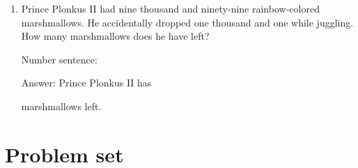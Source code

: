 \documentclass{tufte-book}
\begin{document}
\begin{enumerate}
  \item Prince Plonkus II had nine thousand and ninety-nine rainbow-colored marshmallows.
  He accidentally dropped one thousand and one while juggling.
  How many marshmallows does he have left?\bigskip\par
Number sentence: \dotfill\bigskip\par
Answer: Prince Plonkus II has 
\dotfill\bigskip\par\mbox{}\dotfill\bigskip\par\mbox{}\dotfill\bigskip
 marshmallows left.
\end{enumerate}

\clearpage\section{Problem set }
\end{document}
